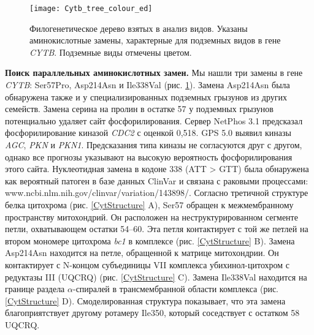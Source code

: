 

\begin{figure}[h!]
	\begin{center}
		\texttt{[image: Cytb\_tree\_colour\_ed]}
	\end{center}
	\caption{Филогенетическое дерево взятых в анализ видов. Указаны аминокислотные замены, характерные для подземных видов в гене \textit{CYTB}. Подземные виды отмечены цветом.}
	\label{PhyloTree}
\end{figure}


\textbf{Поиск параллельных аминокислотных замен.} Мы нашли три замены в гене \textit{CYTB}: Ser57Pro, Asp214Asn и Ile338Val (рис. \ref{PhyloTree}). Замена Asp214Asn была обнаружена также и у специализированных подземных грызунов из других семейств. Замена серина на пролин в остатке 57 у подземных грызунов потенциально удаляет сайт фосфорилирования. Сервер NetPhos 3.1 предсказал фосфорилирование киназой \textit{CDC2} с оценкой 0,518. GPS 5.0 выявил киназы \textit{AGC}, \textit{PKN} и \textit{PKN1}. Предсказания типа киназы не согласуются друг с другом, однако все прогнозы указывают на высокую вероятность фосфорилирования этого сайта. Нуклеотидная замена в кодоне 338 (ATT > GTT) была обнаружена как вероятный патоген в базе данных ClinVar и связана с раковыми процессами: www.ncbi.nlm.nih.gov/clinvar/variation/143898/. Согласно третичной структуре белка цитохрома (рис. \ref{CytStructure} A), Ser57 обращен к межмембранному пространству митохондрий. Он расположен на неструктурированном сегменте петли, охватывающем остатки 54–60. Эта петля контактирует с той же петлей на втором мономере цитохрома \textit{bc1} в комплексе (рис. \ref{CytStructure} B). Замена Asp214Asn находится на петле, обращенной к матрице митохондрии. Он контактирует с N-концом субъединицы VII комплекса убихинол-цитохром с редуктазы III (UQCRQ) (рис. \ref{CytStructure} C). Замена Ile338Val находится на границе раздела $\alpha$-спиралей в трансмембранной области комплекса (рис. \ref{CytStructure} D). Смоделированная структура показывает, что эта замена благоприятствует другому ротамеру Ile350, который соседствует с остатком 58 UQCRQ.



